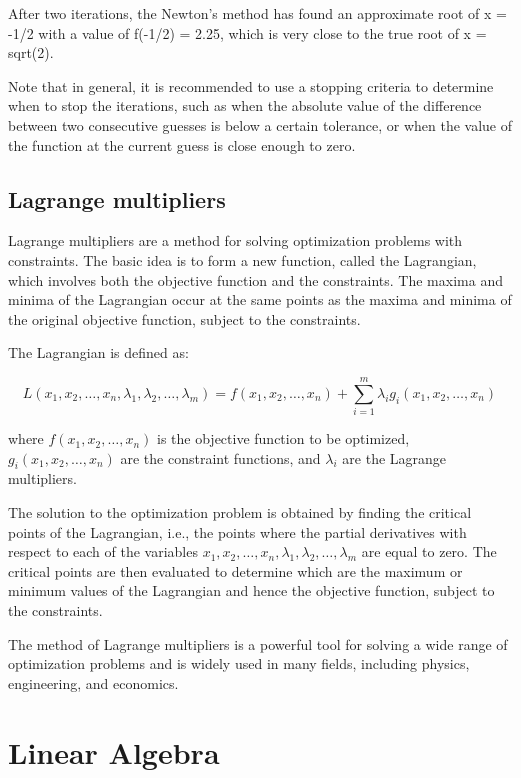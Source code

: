 \documentclass[12pt, a4paper, oneside]{article}
\begin{document}
After two iterations, the Newton's method has found an approximate root of x = -1/2 with a value of f(-1/2) = 2.25, which is very close to the true root of x = sqrt(2).

Note that in general, it is recommended to use a stopping criteria to determine when to stop the iterations, such as when the absolute value of the difference between two consecutive guesses is below a certain tolerance, or when the value of the function at the current guess is close enough to zero.





\subsection{ Lagrange multipliers}
Lagrange multipliers are a method for solving optimization problems with constraints. The basic idea is to form a new function, called the Lagrangian, which involves both the objective function and the constraints. The maxima and minima of the Lagrangian occur at the same points as the maxima and minima of the original objective function, subject to the constraints.

The Lagrangian is defined as:

$$L(x_1,x_2,\ldots,x_n,\lambda_1,\lambda_2,\ldots,\lambda_m) = f(x_1,x_2,\ldots,x_n) + \sum_{i=1}^m \lambda_i g_i(x_1,x_2,\ldots,x_n)$$

where $f(x_1,x_2,\ldots,x_n)$ is the objective function to be optimized, $g_i(x_1,x_2,\ldots,x_n)$ are the constraint functions, and $\lambda_i$ are the Lagrange multipliers.

The solution to the optimization problem is obtained by finding the critical points of the Lagrangian, i.e., the points where the partial derivatives with respect to each of the variables $x_1,x_2,\ldots,x_n,\lambda_1,\lambda_2,\ldots,\lambda_m$ are equal to zero. The critical points are then evaluated to determine which are the maximum or minimum values of the Lagrangian and hence the objective function, subject to the constraints.

The method of Lagrange multipliers is a powerful tool for solving a wide range of optimization problems and is widely used in many fields, including physics, engineering, and economics.




\section{Linear Algebra  }
\end{document}
